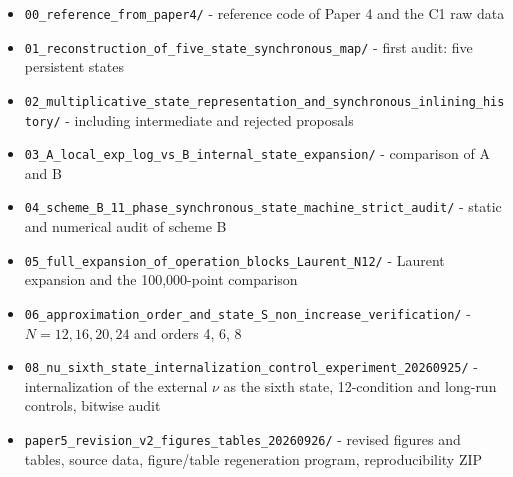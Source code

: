 \documentclass[
  a4paper,
]{article}
\providecommand{\tightlist}{%
  \setlength{\itemsep}{0pt}\setlength{\parskip}{0pt}}
\begin{document}
\begin{itemize}
\tightlist
\item
  \texttt{00\_\allowbreak{}reference\_\allowbreak{}from\_\allowbreak{}paper4/\allowbreak{}} - reference code of Paper 4 and
  the C1 raw data
\item
  \texttt{01\_\allowbreak{}reconstruction\_\allowbreak{}of\_\allowbreak{}five\_\allowbreak{}state\_\allowbreak{}synchronous\_\allowbreak{}map/\allowbreak{}} -
  first audit: five persistent states
\item
  \texttt{02\_\allowbreak{}multiplicative\_\allowbreak{}state\_\allowbreak{}representation\_\allowbreak{}and\_\allowbreak{}synchronous\_\allowbreak{}inlining\_\allowbreak{}history/\allowbreak{}}
  - including intermediate and rejected proposals
\item
  \texttt{03\_\allowbreak{}A\_\allowbreak{}local\_\allowbreak{}exp\_\allowbreak{}log\_\allowbreak{}vs\_\allowbreak{}B\_\allowbreak{}internal\_\allowbreak{}state\_\allowbreak{}expansion/\allowbreak{}} -
  comparison of A and B
\item
  \texttt{04\_\allowbreak{}scheme\_\allowbreak{}B\_\allowbreak{}11\_\allowbreak{}phase\_\allowbreak{}synchronous\_\allowbreak{}state\_\allowbreak{}machine\_\allowbreak{}strict\_\allowbreak{}audit/\allowbreak{}}
  - static and numerical audit of scheme B
\item
  \texttt{05\_\allowbreak{}full\_\allowbreak{}expansion\_\allowbreak{}of\_\allowbreak{}operation\_\allowbreak{}blocks\_\allowbreak{}Laurent\_\allowbreak{}N12/\allowbreak{}} -
  Laurent expansion and the 100,000-point comparison
\item
  \texttt{06\_\allowbreak{}approximation\_\allowbreak{}order\_\allowbreak{}and\_\allowbreak{}state\_\allowbreak{}S\_\allowbreak{}non\_\allowbreak{}increase\_\allowbreak{}verification/\allowbreak{}}
  - \(N=12,16,20,24\) and orders 4, 6, 8
\item
  \texttt{08\_\allowbreak{}nu\_\allowbreak{}sixth\_\allowbreak{}state\_\allowbreak{}internalization\_\allowbreak{}control\_\allowbreak{}experiment\_\allowbreak{}20260925/\allowbreak{}}
  - internalization of the external \(\nu\) as the sixth state,
  12-condition and long-run controls, bitwise audit
\item
  \texttt{paper5\_\allowbreak{}revision\_\allowbreak{}v2\_\allowbreak{}figures\_\allowbreak{}tables\_\allowbreak{}20260926/\allowbreak{}} - revised
  figures and tables, source data, figure/table regeneration program,
  reproducibility ZIP
\end{itemize}
\end{document}
